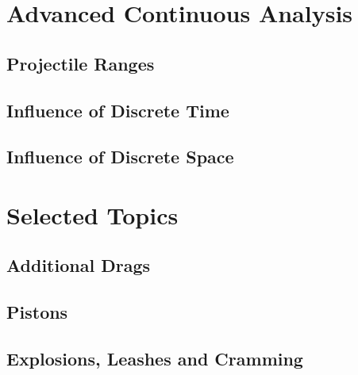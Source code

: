 \documentclass{book}
\theoremstyle{definition}\newtheorem{mechanism}{Mechanism}
\theoremstyle{remark}\newtheorem*{remark}{Remark}
\begin{document}
\chapter{Advanced Continuous Analysis}

\section{Projectile Ranges}


\section{Influence of Discrete Time}


\section{Influence of Discrete Space}



\chapter{Selected Topics}

\section{Additional Drags}


\section{Pistons}


\section{Explosions, Leashes and Cramming}

\end{document}
